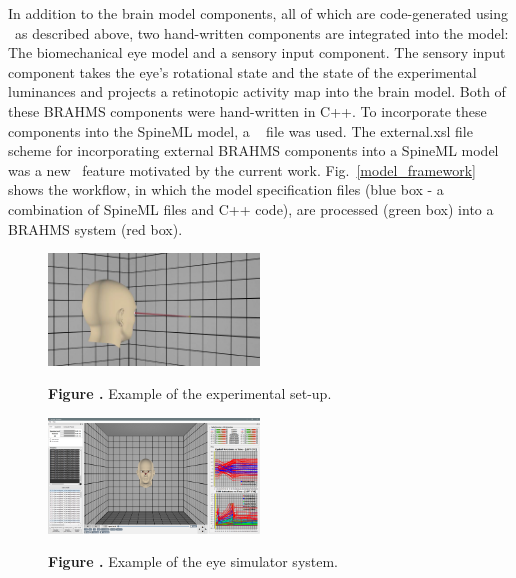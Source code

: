 \documentclass{frontiersSCNS}
\begin{document}
In addition to the brain model components, all of which are
code-generated using \stob~as described above, two hand-written
components are integrated into the model: The biomechanical eye model
and a sensory input component. The sensory input component takes the
eye's rotational state and the state of the experimental luminances
and projects a retinotopic activity map into the brain model. Both of
these BRAHMS components were hand-written in C++. To incorporate these
components into the SpineML model, a \stob~ file was
used.  The external.xsl file scheme for incorporating external BRAHMS
components into a SpineML model was a new \stob~feature motivated by
the current work.  Fig.~\ref{model_framework} shows the workflow, in
which the model specification files (blue box - a combination of
SpineML files and C++ code), are processed (green box) into a BRAHMS
system (red box).



\begin{figure}[htb!]
\begin{center}
\includegraphics[width=0.5\textwidth]{./figures/Eye_sim0.png}
\end{center}
\textbf{\label{fig:eye_sim0} Figure .}
{Example of the experimental set-up.}
\end{figure}

\begin{figure}[htb!]
\begin{center}
\includegraphics[width=0.5\textwidth]{./figures/Eye_sim1.png}
\end{center}
\textbf{\label{fig:eye_sim1} Figure .}
{Example of the eye simulator system.}
\end{figure}
\end{document}
